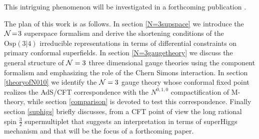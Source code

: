 \documentclass[a4paper,12pt]{article}
\newcommand{\ft}[2]{{\textstyle\frac{#1}{#2}}}
\def\n010{N^{0,1,0}}
\begin{document}
This intriguing phenomenon will be investigated in a forthcoming
publication \cite{noinext}.
\par
The plan of this work is as follows.
In section \ref{N=3supspace} we introduce the ${\cal N}\!=\!3$
superspace formalism and derive the shortening conditions of
the $\mathrm{Osp(3|4)}$ irreducible representations in terms of
differential constraints on primary conformal superfields.
In section \ref{N=3gaugetheory} we discuss the general structure of
${\cal N}=3$ three dimensional gauge theories using the component
formalism and emphasizing the role of the Chern Simons interaction.
In section \ref{theoryofN010} we identify the ${\cal N}=3$ gauge
theory whose conformal fixed point realizes the AdS/CFT correspondence
with the $\n010$ compactification of M-theory, while section
\ref{comparison} is devoted to test this correspondence.
Finally section \ref{suphigs} briefly discusses, from a CFT point of
view the long rational spin $\ft 32$ supermultiplet that suggests an
interpretation in terms of superHiggs mechanism and that will be the
focus of a forthcoming paper.
\end{document}
